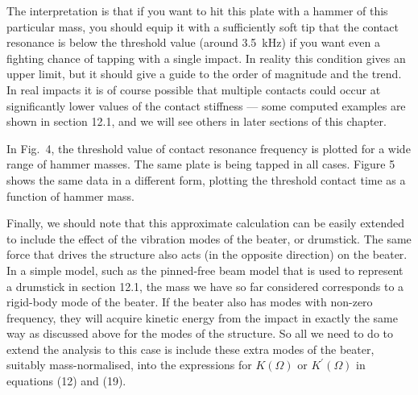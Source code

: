   The interpretation is that if you want to hit this plate with a hammer of 
  this particular mass, you should equip it with a sufficiently soft tip that 
  the contact resonance is below the threshold value (around 3.5~kHz) if you 
  want even a fighting chance of tapping with a single impact. In reality this 
  condition gives an upper limit, but it should give a guide to the order of 
  magnitude and the trend. In real impacts it is of course possible that 
  multiple contacts could occur at significantly lower values of the contact 
  stiffness --- some computed examples are shown in section 12.1, and we will 
  see others in later sections of this chapter. 

  In Fig.\ 4, the threshold value of contact resonance frequency is plotted for 
  a wide range of hammer masses. The same plate is being tapped in all cases. 
  Figure 5 shows the same data in a different form, plotting the threshold 
  contact time as a function of hammer mass. 



  Finally, we should note that this approximate calculation can be easily 
  extended to include the effect of the vibration modes of the beater, or 
  drumstick. The same force that drives the structure also acts (in the 
  opposite direction) on the beater. In a simple model, such as the pinned-free 
  beam model that is used to represent a drumstick in section 12.1, the mass we 
  have so far considered corresponds to a rigid-body mode of the beater. If the 
  beater also has modes with non-zero frequency, they will acquire kinetic 
  energy from the impact in exactly the same way as discussed above for the 
  modes of the structure. So all we need to do to extend the analysis to this 
  case is include these extra modes of the beater, suitably mass-normalised, 
  into the expressions for $K(\Omega)$ or $K^\prime (\Omega)$ in equations (12) 
  and (19). 